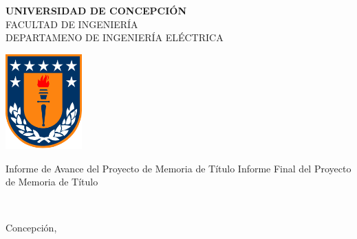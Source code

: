 
\begin{titlepage}
\begin{center}
%
{\LARGE\textbf{UNIVERSIDAD DE CONCEPCIÓN}}\\[.4em]
{\Large FACULTAD DE INGENIERÍA}\\[.4em]%
{\large DEPARTAMENO DE INGENIERÍA ELÉCTRICA}%
\end{center}
\vskip 1.5cm
\begin{center}
\includegraphics[width=0.22\textwidth]{logoudec}%
\end{center}
\vskip 2cm
\begin{center}
\ifdefined\InfAvance
Informe de Avance del Proyecto de Memoria de Título
\else
Informe Final del Proyecto de Memoria de Título
\fi
\vskip 1cm
\begin{minipage}{0.9\textwidth}
\begin{center}
{\Huge\textbf{\Title} \par }
\end{center}
\end{minipage}

\vskip 1cm
{\large{\textbf{\Author}}}

\vfill

\begin{large}
\makeatletter
\textbf{
\@ProfGuia\\%
\@ComisionA%
\@ComisionB%
}%
\makeatother
\end{large}

\vskip 1.5cm

Concepción, \monthname\ \the\year
\end{center}

\ifdefined\NoBgThispage
\NoBgThispage
\fi
\end{titlepage}
\ifdefined\NoBgThispage
\NoBgThispage
\fi